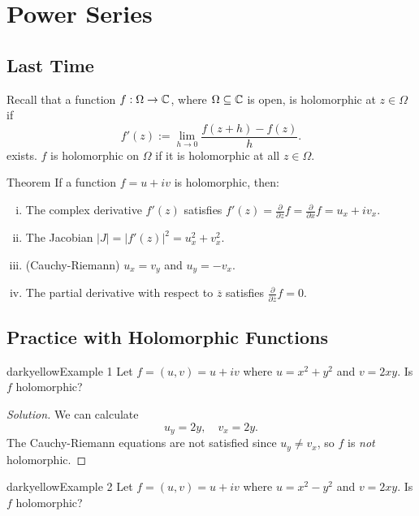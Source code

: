 \chapter{Power Series}

\section{Last Time}
Recall that a function $f : \Omega \to \mathbb{C}$, where
$\Omega \subseteq \mathbb{C}$ is open, is holomorphic
at $z \in \Omega$ if
\[
  f'(z) := \lim_{h \to 0} \frac{f(z + h) - f(z)}{h}
.\]
exists. $f$ is holomorphic on $\Omega$ if it is
holomorphic at all $z \in \Omega$.

\begin{thm}{Theorem}
If a function $f = u + iv$ is holomorphic, then:
\begin{enumerate}[(i).]
  \item The complex derivative $f'(z)$ satisfies
    $f'(z) = \frac{\partial}{\partial z} f = \frac{\partial}{\partial x} f = u_x + iv_x$.
  \item The Jacobian $\left\lvert J \right\rvert = \left\lvert f'(z) \right\rvert^2 = u_x^2 + v_x^2$.
  \item (Cauchy-Riemann) $u_x = v_y$ and $u_y = -v_x$.
  \item The partial derivative with respect to $\overline{z}$ satisfies
    $\frac{\partial}{\partial \overline{z}} f = 0$.
\end{enumerate}
\end{thm}

\section{Practice with Holomorphic Functions}
\begin{mybox}{darkyellow}{Example 1}
  Let $f = (u, v) = u + iv$ where $u = x^2 + y^2$ and
  $v = 2xy$. Is $f$ holomorphic?
\end{mybox}

\begin{proof}[Solution]
  We can calculate
  \[u_y = 2y, \quad v_x = 2y.\]
  The Cauchy-Riemann equations are not satisfied since
  $u_y \ne v_x$, so $f$ is \textit{not} holomorphic.
\end{proof}

\begin{mybox}{darkyellow}{Example 2}
  Let $f = (u, v) = u + iv$ where $u = x^2 - y^2$ and
  $v = 2xy$. Is $f$ holomorphic?
\end{mybox}

